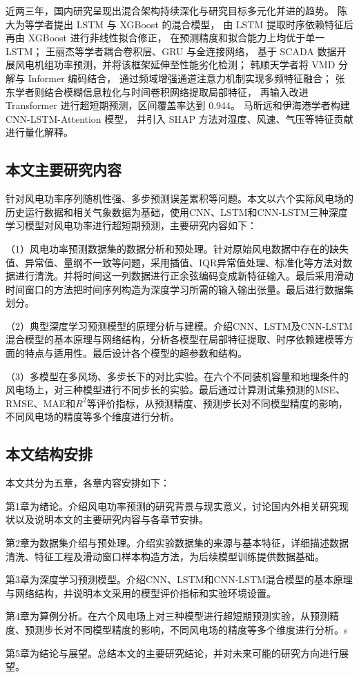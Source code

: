 近两三年，国内研究呈现出混合架构持续深化与研究目标多元化并进的趋势。
陈大为等学者\cite{_lstmxgboost_2025}提出 LSTM 与 XGBoost 的混合模型，
由 LSTM 提取时序依赖特征后再由 XGBoost 进行非线性拟合修正，
在预测精度和拟合能力上均优于单一 LSTM；
王丽杰等学者\cite{__2022-1}耦合卷积层、GRU 与全连接网络，
基于 SCADA 数据开展风电机组功率预测，并将该框架延伸至性能劣化检测；
韩顺天学者\cite{__2025-2}将 VMD 分解与 Informer 编码结合，
通过频域增强通道注意力机制实现多频特征融合；
张东学者\cite{__2025-1}则结合模糊信息粒化与时间卷积网络提取局部特征，
再输入改进 Transformer 进行超短期预测，区间覆盖率达到 0.944。
马昕远和伊海港学者\cite{_cnn-lstm-attention_2025}构建 CNN-LSTM-Attention 模型，
并引入 SHAP 方法对湿度、风速、气压等特征贡献进行量化解释。


\subsection{本文主要研究内容}

针对风电功率序列随机性强、多步预测误差累积等问题。本文以六个实际风电场的历史运行数据和相关气象数据为基础，使用CNN、LSTM和CNN-LSTM三种深度学习模型对风电功率进行超短期预测，主要研究内容如下：

（1）风电功率预测数据集的数据分析和预处理。针对原始风电数据中存在的缺失值、异常值、量纲不一致等问题，采用插值、IQR异常值处理、标准化等方法对数据进行清洗。并将时间这一列数据进行正余弦编码变成新特征输入。最后采用滑动时间窗口的方法把时间序列构造为深度学习所需的输入输出张量。最后进行数据集划分。

（2）典型深度学习预测模型的原理分析与建模。介绍CNN、LSTM及CNN-LSTM混合模型的基本原理与网络结构，分析各模型在局部特征提取、时序依赖建模等方面的特点与适用性。最后设计各个模型的超参数和结构。

（3）多模型在多风场、多步长下的对比实验。在六个不同装机容量和地理条件的风电场上，对三种模型进行不同步长的实验。最后通过计算测试集预测的MSE、RMSE、MAE和$R^2$等评价指标，从预测精度、预测步长对不同模型精度的影响，不同风电场的精度等多个维度进行分析。

\subsection{本文结构安排}

本文共分为五章，各章内容安排如下：

第1章为绪论。介绍风电功率预测的研究背景与现实意义，讨论国内外相关研究现状以及说明本文的主要研究内容与各章节安排。

第2章为数据集介绍与预处理。介绍实验数据集的来源与基本特征，详细描述数据清洗、特征工程及滑动窗口样本构造方法，为后续模型训练提供数据基础。

第3章为深度学习预测模型。介绍CNN、LSTM和CNN-LSTM混合模型的基本原理与网络结构，并说明本文采用的模型评价指标和实验环境设置。

第4章为算例分析。在六个风电场上对三种模型进行超短期预测实验，从预测精度、预测步长对不同模型精度的影响，不同风电场的精度等多个维度进行分析。s

第5章为结论与展望。总结本文的主要研究结论，并对未来可能的研究方向进行展望。
